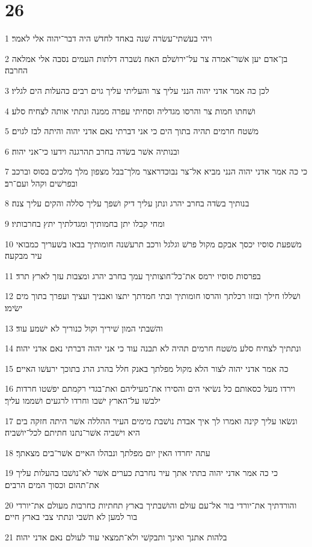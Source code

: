 \chapter{26}

\par 1 ויהי בעשׁתי־עשׂרה שׁנה באחד לחדשׁ היה דבר־יהוה אלי לאמר׃
\par 2 בן־אדם יען אשׁר־אמרה צר על־ירושׁלם האח נשׁברה דלתות העמים נסבה אלי אמלאה החרבה׃
\par 3 לכן כה אמר אדני יהוה הנני עליך צר והעליתי עליך גוים רבים כהעלות הים לגליו׃
\par 4 ושׁחתו חמות צר והרסו מגדליה וסחיתי עפרה ממנה ונתתי אותה לצחיח סלע׃
\par 5 משׁטח חרמים תהיה בתוך הים כי אני דברתי נאם אדני יהוה והיתה לבז לגוים׃
\par 6 ובנותיה אשׁר בשׂדה בחרב תהרגנה וידעו כי־אני יהוה׃
\par 7 כי כה אמר אדני יהוה הנני מביא אל־צר נבוכדראצר מלך־בבל מצפון מלך מלכים בסוס וברכב ובפרשׁים וקהל ועם־רב׃
\par 8 בנותיך בשׂדה בחרב יהרג ונתן עליך דיק ושׁפך עליך סללה והקים עליך צנה׃
\par 9 ומחי קבלו יתן בחמותיך ומגדלתיך יתץ בחרבותיו׃
\par 10 משׁפעת סוסיו יכסך אבקם מקול פרשׁ וגלגל ורכב תרעשׁנה חומותיך בבאו בשׁעריך כמבואי עיר מבקעה׃
\par 11 בפרסות סוסיו ירמס את־כל־חוצותיך עמך בחרב יהרג ומצבות עזך לארץ תרד׃
\par 12 ושׁללו חילך ובזזו רכלתך והרסו חומותיך ובתי חמדתך יתצו ואבניך ועציך ועפרך בתוך מים ישׂימו׃
\par 13 והשׁבתי המון שׁיריך וקול כנוריך לא ישׁמע עוד׃
\par 14 ונתתיך לצחיח סלע משׁטח חרמים תהיה לא תבנה עוד כי אני יהוה דברתי נאם אדני יהוה׃
\par 15 כה אמר אדני יהוה לצור הלא מקול מפלתך באנק חלל בהרג הרג בתוכך ירעשׁו האיים׃
\par 16 וירדו מעל כסאותם כל נשׂיאי הים והסירו את־מעיליהם ואת־בגדי רקמתם יפשׁטו חרדות ילבשׁו על־הארץ ישׁבו וחרדו לרגעים ושׁממו עליך׃
\par 17 ונשׂאו עליך קינה ואמרו לך איך אבדת נושׁבת מימים העיר ההללה אשׁר היתה חזקה בים היא וישׁביה אשׁר־נתנו חתיתם לכל־יושׁביה׃
\par 18 עתה יחרדו האין יום מפלתך ונבהלו האיים אשׁר־בים מצאתך׃
\par 19 כי כה אמר אדני יהוה בתתי אתך עיר נחרבת כערים אשׁר לא־נושׁבו בהעלות עליך את־תהום וכסוך המים הרבים׃
\par 20 והורדתיך את־יורדי בור אל־עם עולם והושׁבתיך בארץ תחתיות כחרבות מעולם את־יורדי בור למען לא תשׁבי ונתתי צבי בארץ חיים׃
\par 21 בלהות אתנך ואינך ותבקשׁי ולא־תמצאי עוד לעולם נאם אדני יהוה׃

